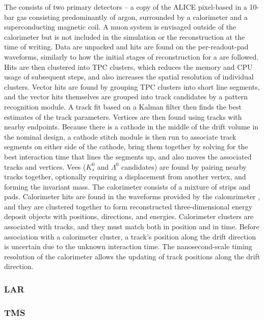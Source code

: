 \documentclass[../main-v1.tex]{subfiles}
\begin{document}
The  consists of two primary detectors -- a copy of the ALICE pixel-based  in a 10-bar gas consisting predominantly of argon, surrounded by a calorimeter and a superconducting magnetic coil.  A muon system is envisaged outside of the calorimeter but is not included in the simulation or the reconstruction at the time of writing.  Data are unpacked and hits are found on the per-readout-pad waveforms, similarly to how the initial stages of reconstruction for a  are followed.  Hits are then clustered into TPC clusters, which reduces the memory and CPU usage of subsequent steps, and also increases the spatial resolution of individual clusters.  Vector hits are found by grouping TPC clusters into short line segments, and the vector hits themselves are grouped into track candidates by a pattern recognition module.  A track fit based on a Kalman filter then finds the best estimates of the track parameters.  Vertices are then found using tracks with nearby endpoints.  Because there is a cathode in the middle of the drift volume in the nominal design, a cathode stitch module is then run to associate track segments on either side of the cathode, bring them together by solving for the best interaction time that lines the segments up, and also moves the associated tracks and vertices.  Vees ($K^0_s$ and
$\Lambda^0$ candidates) are found by pairing nearby tracks together, optionally requiring a displacement from another vertex, and forming the invariant mass.  The calorimeter consists of a mixture of strips and pads.  Calorimeter hits are found in the  waveforms provided by the calomrimeter , and they are clustered together to form reconstructed three-dimensional energy deposit objects with positions, directions, and energies.  Calorimeter clusters are associated with tracks, and they must match both in position and in time.  Before association with a calorimeter cluster, a track's position along the drift direction is uncertain due to the unknown interaction time.
The nanosecond-scale timing resolution of the calorimeter allows the updating of track positions along the drift direction.

\subsubsection{LAR}

\subsubsection{TMS}
\end{document}
